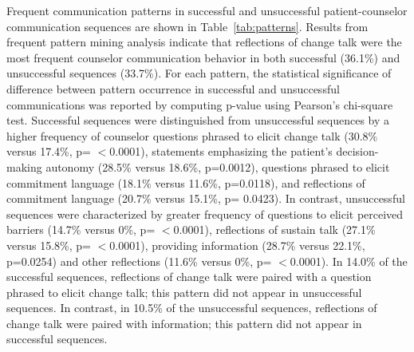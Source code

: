Frequent communication patterns in successful and unsuccessful patient-counselor communication sequences are shown in Table~\ref{tab:patterns}. Results from frequent pattern mining analysis indicate that reflections of change talk were the most frequent counselor communication behavior in both successful (36.1\%) and unsuccessful sequences (33.7\%). For each pattern, the statistical significance of difference between pattern occurrence in successful and unsuccessful communications was reported by computing p-value using Pearson's chi-square test. Successful sequences were distinguished from unsuccessful sequences by a higher frequency of counselor questions phrased to elicit change talk (30.8\% versus 17.4\%, p= $<$0.0001), statements emphasizing the patient's decision-making autonomy (28.5\% versus 18.6\%, p=0.0012), questions phrased to elicit commitment language (18.1\% versus 11.6\%, p=0.0118), and reflections of commitment language (20.7\% versus 15.1\%, p= 0.0423). In contrast, unsuccessful sequences were characterized by greater frequency of questions to elicit perceived barriers (14.7\% versus 0\%, p= $<$0.0001), reflections of sustain talk (27.1\% versus 15.8\%, p= $<$0.0001), providing information (28.7\% versus 22.1\%, p=0.0254) and other reflections (11.6\% versus 0\%, p= $<$0.0001). In 14.0\% of the successful sequences, reflections of change talk were paired with a question phrased to elicit change talk; this pattern did not appear in unsuccessful sequences. In contrast, in 10.5\% of the unsuccessful sequences, reflections of change talk were paired with information; this pattern did not appear in successful sequences.

